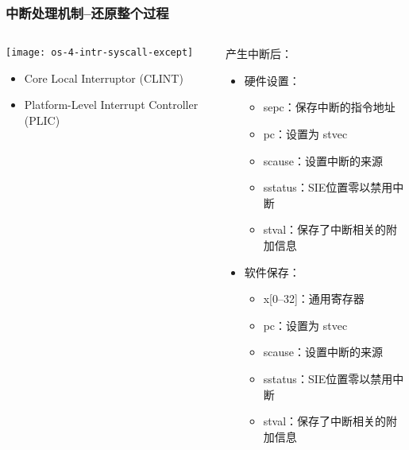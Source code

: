 \begin{frame}[plain,t]
	\frametitle{中断处理机制--还原整个过程}
	\begin{columns}
		
		\begin{column}{0.4\textwidth}
			\centering
			\texttt{[image: os-4-intr-syscall-except]}
			\begin{itemize} \small
				\item Core Local	Interruptor (CLINT)
				\item Platform-Level Interrupt Controller (PLIC)
			\end{itemize}
			
		\end{column}
		
		\begin{column}{0.5\textwidth}
			
			\centering
			产生中断后：
			\begin{itemize} \small 
				\item 硬件设置：\pause
				\begin{itemize} \small 
					\item sepc：保存中断的指令地址	
					\item pc：设置为 stvec
					\item scause：设置中断的来源
					\item sstatus：SIE位置零以禁用中断					
					\item stval：保存了中断相关的附加信息
			   \end{itemize}	
				\item 软件保存：\pause
				\begin{itemize} \small 
					\item x[0--32]：通用寄存器 	
					\item pc：设置为 stvec
					\item scause：设置中断的来源
					\item sstatus：SIE位置零以禁用中断					
					\item stval：保存了中断相关的附加信息
				\end{itemize}											
			\end{itemize}
			
		\end{column}
		
	\end{columns}
	
\end{frame}	

